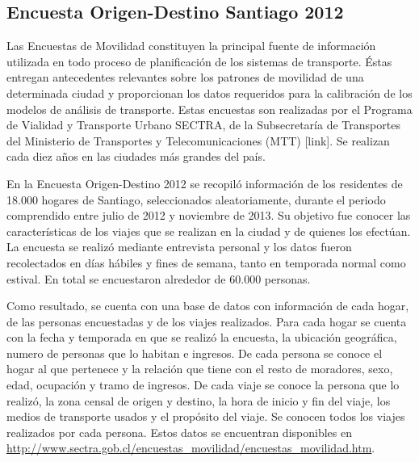 \subsection{Encuesta Origen-Destino Santiago 2012}\label{sec:eod}

Las Encuestas de Movilidad constituyen la principal fuente de información utilizada en todo proceso de planificación de los sistemas de transporte. Éstas entregan antecedentes relevantes sobre los patrones de movilidad de una determinada ciudad y proporcionan los datos requeridos para la calibración de los modelos de análisis de transporte.  %
Estas encuestas son realizadas por el Programa de Vialidad y Transporte Urbano SECTRA, de la Subsecretaría de Transportes del Ministerio de Transportes y Telecomunicaciones (MTT) [link]. Se realizan cada diez años en las ciudades más grandes del país.

En la Encuesta Origen-Destino 2012 \cite{SECTRA2014} se recopiló información de los residentes de 18.000 hogares de Santiago, seleccionados aleatoriamente, durante el periodo comprendido entre julio de 2012 y noviembre de 2013. Su objetivo fue conocer las características de los viajes que se realizan en la ciudad y de quienes los efectúan. La encuesta se realizó mediante entrevista personal y los datos fueron recolectados en días hábiles y fines de semana, tanto en temporada normal como estival. En total se encuestaron alrededor de 60.000 personas.


Como resultado, se cuenta con una base de datos con información de cada hogar, de las personas encuestadas y de los viajes realizados. Para cada hogar se cuenta con la fecha y temporada en que se realizó la encuesta, la ubicación geográfica, numero de personas que lo habitan e ingresos. De cada persona se conoce el hogar al que pertenece y la relación que tiene con el resto de moradores, sexo, edad, ocupación y tramo de ingresos. De cada viaje se conoce la persona que lo realizó, la zona censal de origen y destino, la hora de inicio y fin del viaje, los medios de transporte usados y el propósito del viaje. Se conocen todos los viajes realizados por cada persona. Estos datos se encuentran disponibles en \url{http://www.sectra.gob.cl/encuestas_movilidad/encuestas_movilidad.htm}.


